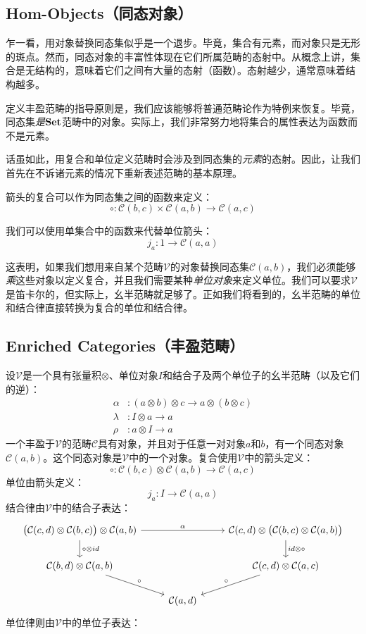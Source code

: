 \documentclass[DaoFP]{subfiles}
\begin{document}
 \subsection{Hom-Objects（同态对象）}

 乍一看，用对象替换同态集似乎是一个退步。毕竟，集合有元素，而对象只是无形的斑点。然而，同态对象的丰富性体现在它们所属范畴的态射中。从概念上讲，集合是无结构的，意味着它们之间有大量的态射（函数）。态射越少，通常意味着结构越多。

 定义丰盈范畴的指导原则是，我们应该能够将普通范畴论作为特例来恢复。毕竟，同态集\emph{是}$\mathbf{Set}$范畴中的对象。实际上，我们非常努力地将集合的属性表达为函数而不是元素。

 话虽如此，用复合和单位定义范畴时会涉及到同态集的\emph{元素}的态射。因此，让我们首先在不诉诸元素的情况下重新表述范畴的基本原理。

 箭头的复合可以作为同态集之间的函数来定义：
 \[ \circ \colon \mathcal C (b, c) \times \mathcal C (a, b) \to \mathcal C (a, c) \]

 我们可以使用单集合中的函数来代替单位箭头：
 \[ j_a \colon 1 \to \mathcal C (a, a) \]

 这表明，如果我们想用来自某个范畴$\mathcal V$的对象替换同态集$\mathcal C (a, b)$，我们必须能够\emph{乘}这些对象以定义复合，并且我们需要某种\emph{单位对象}来定义单位。我们可以要求$\mathcal V$是笛卡尔的，但实际上，幺半范畴就足够了。正如我们将看到的，幺半范畴的单位和结合律直接转换为复合的单位和结合律。

 \subsection{Enriched Categories（丰盈范畴）}

 设$\mathcal V$是一个具有张量积$\otimes$、单位对象$I$和结合子及两个单位子的幺半范畴（以及它们的逆）：
 \begin{align*}
  \alpha &\colon (a \otimes b) \otimes c \to a \otimes (b \otimes c)
  \\
  \lambda &\colon I \otimes a \to a
  \\
  \rho &\colon a \otimes I \to a
 \end{align*}
 一个丰盈于$\mathcal V$的范畴$\mathcal C$具有对象，并且对于任意一对对象$a$和$b$，有一个同态对象$\mathcal C(a, b)$。这个同态对象是$\mathcal V$中的一个对象。复合使用$\mathcal V$中的箭头定义：
 \[ \circ \colon \mathcal C (b, c) \otimes \mathcal C (a, b) \to \mathcal C (a, c) \]
 单位由箭头定义：
 \[ j_a \colon I \to \mathcal C (a, a) \]
 结合律由$\mathcal V$中的结合子表达：
 \[
  \begin{tikzcd}
   \big( \mathcal C (c, d) \otimes \mathcal C (b, c) \big) \otimes \mathcal C(a, b)
   \arrow[rr, "\alpha"]
   \arrow[d, "\circ \otimes id"]
   &&  \mathcal C (c, d) \otimes \big( \mathcal C (b, c) \otimes \mathcal C(a, b) \big)
   \arrow[d, "id \otimes \circ"]
   \\
   \mathcal C(b, d) \otimes \mathcal C(a, b)
   \arrow[dr, "\circ"]
   && \mathcal C(c, d) \otimes \mathcal C(a, c)
   \arrow[dl, "\circ"']
   \\
   & \mathcal C(a, d)
  \end{tikzcd}
 \]
 单位律则由$\mathcal V$中的单位子表达：
\end{document}
